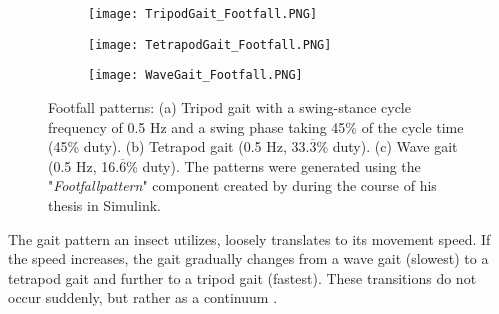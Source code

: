 \begin{figure}[h]
	\begin{subfigure}{\textwidth} %
		\centering
		\texttt{[image: TripodGait\_Footfall.PNG]}  %
		\caption{}
		\label{figure: tripod footfall}
	\end{subfigure}
	
	\begin{subfigure}{\textwidth}
		\centering
		\texttt{[image: TetrapodGait\_Footfall.PNG]}  
		\caption{}
		\label{figure: tetrapod footfall}
	\end{subfigure}
	
	\begin{subfigure}{\textwidth}
		\centering
		\texttt{[image: WaveGait\_Footfall.PNG]}   %
		\caption{}
		\label{figure: wave footfall}
	\end{subfigure}
	\caption[Footfall Patterns]{Footfall patterns: (a) Tripod gait with a swing-stance cycle frequency of 0.5 Hz and a swing phase taking 45\% of the cycle time (45\% duty). (b) Tetrapod gait (0.5 Hz, 33.$\overline{3}$\% duty). (c) Wave gait (0.5 Hz, 16.$\overline{6}$\% duty). The patterns were generated using the "\textit{Footfallpattern}" component created by \cite{sanandoHexapod} during the course of his thesis in Simulink.}
	\label{figure: Footfall patterns}
\end{figure}

The gait pattern an insect utilizes, loosely translates to its movement speed.
If the speed increases, the gait gradually changes from a wave gait (slowest) to a tetrapod gait and further to a tripod gait (fastest).
These transitions do not occur suddenly, but rather as a continuum \parencite{schilling2013walknet}.


